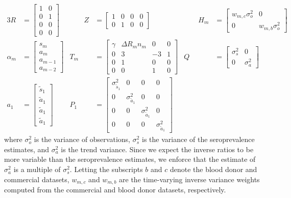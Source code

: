 \documentclass{article}
\begin{document}
\begin{alignat*}{3}
R &= \begin{bmatrix}
1 & 0  \\ 
0 & 1 \\ 
0 & 0 \\ 
0 & 0 
\end{bmatrix} &\qquad 
Z &= \begin{bmatrix}
1 & 0 & 0 & 0 \\ 
0 & 1 & 0 & 0 
\end{bmatrix} &\qquad 
H_m &= \begin{bmatrix} %
w_{m,c}\sigma^2_o & 0 \\ 
0 & w_{m,b}\sigma^2_o
\end{bmatrix} \\
\alpha_m &= \begin{bmatrix}
s_{m}\\
a_m\\ 
a_{m-1}\\ 
a_{m-2}
\end{bmatrix} & 
T_m &= \begin{bmatrix}
 \gamma & \Delta R_mn_m & 0 & 0\\ 
 0 & 3 & -3 & 1 \\ 
 0 & 1 & 0 & 0\\ 
 0 & 0 & 1 & 0
\end{bmatrix}  & 
Q &= \begin{bmatrix} 
\sigma^2_s & 0  \\ 
0 & \sigma^2_a
\end{bmatrix} \\
a_1 &= \begin{bmatrix}
\tilde{s}_{1}\\ 
\tilde{a}_1\\ 
\tilde{a}_1 \\
\tilde{a}_1
\end{bmatrix} & 
P_{1} &= \begin{bmatrix}
\sigma^2_{\tilde{s}_{1}} & 0 & 0 & 0 \\ 
0 & \sigma^2_{\tilde{a}_1} & 0 & 0\\ 
0 & 0 & \sigma^2_{\tilde{a}_1} & 0 \\ 
0 & 0 & 0 & \sigma^2_{\tilde{a}_1}
\end{bmatrix} 
\end{alignat*}
where $\sigma^2_o$ is the variance of observations,
$\sigma^2_s$ is the variance of the seroprevalence estimates, 
and $\sigma^2_a$ is the trend variance. Since we expect the 
inverse ratios to be more variable than the seroprevalence estimates, 
we enforce that the estimate of $\sigma^2_a$ is a multiple of 
$\sigma^2_s$. Letting the subscripts $b$ and $c$ denote
the blood donor and commercial datasets, $w_{m,c}$ and $w_{m,b}$ are the
time-varying inverse variance weights computed from the commercial and blood
donor datasets, respectively. 
\end{document}
